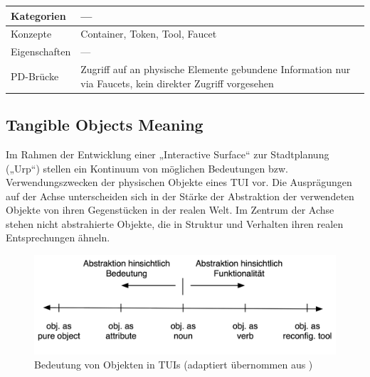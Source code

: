 \begin{tabular}{| p{3cm} | p{10cm} |}
  \hline
  Kategorien & --- \\ \hline
  Konzepte & Container, Token, Tool, Faucet \\ \hline
  Eigenschaften & --- \\ \hline
  PD-Brücke & Zugriff auf an physische Elemente gebundene Information nur via Faucets, kein direkter Zugriff vorgesehen \\ \hline
\end{tabular} 


\subsection{Tangible Objects Meaning} %
\label{sub:tangible_objects_meaning}

Im Rahmen der Entwicklung einer „Interactive Surface“ zur Stadtplanung („Urp“) stellen \citet{Underkoffler99} ein Kontinuum von möglichen Bedeutungen bzw. Verwendungszwecken der physischen Objekte eines \gls{TUI} vor. Die Ausprägungen auf der Achse unterscheiden sich in der Stärke der Abstraktion der verwendeten Objekte von ihren Gegenstücken in der realen Welt. Im Zentrum der Achse stehen nicht abstrahierte Objekte, die in Struktur und Verhalten ihren realen Entsprechungen ähneln.
\begin{figure}[htbp]
	\centering
		\includegraphics[width=12cm]{img/ImplementierungUeberblick/ObjectMeaning.png}
	\caption[Bedeutung von Objekten in TUIs]{Bedeutung von Objekten in TUIs (adaptiert übernommen aus \citep{Underkoffler99})}
	\label{fig:img_ImplementierungUeberblick_ObjectMeaning}
\end{figure}

